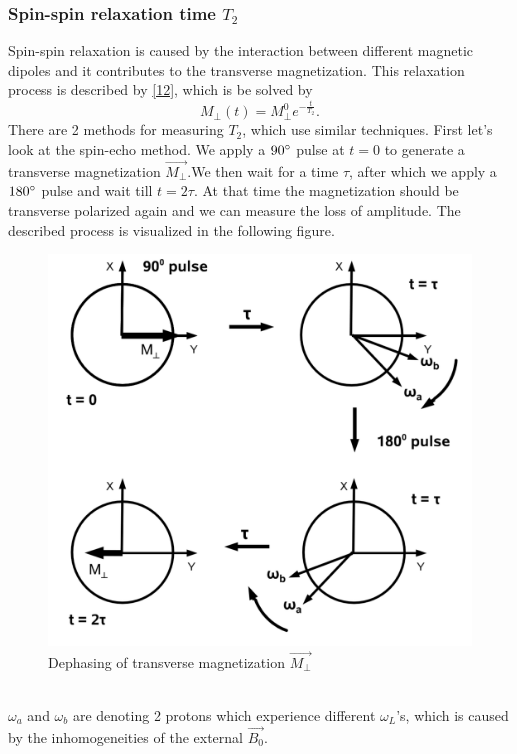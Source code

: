 \subsubsection{Spin-spin relaxation time $T_{2}$}
Spin-spin relaxation is caused by the interaction between different magnetic dipoles and it contributes to the transverse magnetization. This relaxation process is described by \eqref{12}, which is be solved by 
\begin{equation}
	\label{15}
	M_{\perp}(t) = M_{\perp}^{0}e^{-\frac{t}{T_{2}}}.
\end{equation}
There are 2 methods for measuring $T_2$, which use similar techniques. First let's look at the spin-echo method. We apply a $90\degree$ pulse at $t = 0$ to generate a transverse magnetization $\vec{M_{\perp}}$.We then wait for a time $\tau$, after which we apply a $180\degree$ pulse and wait till $t=2\tau$. At that time the magnetization should be transverse polarized again and we can measure the loss of amplitude. The described process is visualized in the following figure.
\begin{figure}[h!]
	\centering
	\includegraphics[scale=0.53]{images/spin_echo.png}
	\caption{Dephasing of transverse magnetization $\vec{M_{\perp}}$}
	\label{spin-spin}
\end{figure} \\
$\omega_a$ and $\omega_b$ are denoting 2 protons which experience different $\omega_L$'s, which is caused by the inhomogeneities of the external $\vec{B_0}$.\\
